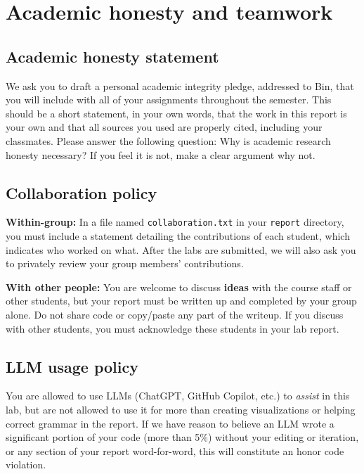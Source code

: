\documentclass[letterpaper,12pt]{article}
\begin{document}
\section{Academic honesty and teamwork}

\subsection{Academic honesty statement}

We ask you to draft a personal academic integrity pledge, addressed to Bin, that you will include with all of your assignments throughout the semester. This should be a short statement, in your own words, that the work in this report is your own and that all sources you used are properly cited, including your classmates. Please answer the following question: Why is academic research honesty necessary? If you feel it is not, make a clear argument why not.

\subsection{Collaboration policy}

\textbf{Within-group:} In a file named \texttt{collaboration.txt} in your \texttt{report} directory, you must include a statement detailing the contributions of each student, which indicates who worked on what. After the labs are submitted, we will also ask you to privately review your group members' contributions.

\textbf{With other people:} 
You are welcome to discuss \textbf{ideas} with the course staff or other students, but your report must be written up and completed by your group alone. Do not share code or copy/paste any part of the writeup. If you discuss with other students, you must acknowledge these students in your lab report.

\subsection{LLM usage policy}

You are allowed to use LLMs (ChatGPT, GitHub Copilot, etc.) to \textit{assist} in this lab, but are not allowed to use it for more than creating visualizations or helping correct grammar in the report. If we have reason to believe an LLM wrote a significant portion of your code (more than 5\%) without your editing or iteration, or any section of your report word-for-word, this will constitute an honor code violation.
\end{document}
